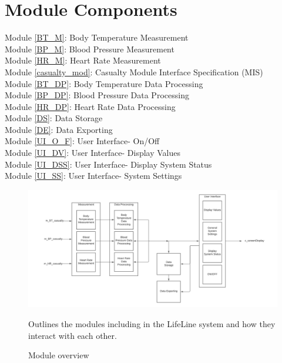 \documentclass{article}
\begin{document}
    \section {Module Components}
    \begin{description}
    Module \ref{BT_M}: Body Temperature Measurement\\
    Module \ref{BP_M}: Blood Pressure Measurement \\
    Module \ref{HR_M}: Heart Rate Measurement \\
    Module \ref{casualty_mod}: Casualty Module Interface Specification (MIS) \\
    Module \ref{BT_DP}: Body Temperature Data Processing \\
    Module \ref{BP_DP}: Blood Pressure Data Processing \\
    Module \ref{HR_DP}: Heart Rate Data Processing \\
    Module \ref{DS}: Data Storage \\
    Module \ref{DE}: Data Exporting \\
    Module \ref{UI_O_F}: User Interface- On/Off \\
    Module \ref{UI_DV}: User Interface- Display Values \\
    Module \ref{UI_DSS}: User Interface- Display System Status \\
    Module \ref{UI_SS}: User Interface- System Settings \\
    
        \begin{figure}[!htb]
    	\centering
    	\includegraphics[width=1\linewidth]{module overview rev2.png}
    	\caption{Module overview}{Outlines the modules including in the LifeLine system and how they interact with each other.}
    \end{figure}
    

\end{description}
\end{document}
